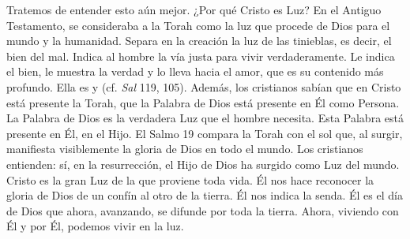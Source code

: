 \begin{body}
Tratemos de entender esto aún mejor. ¿Por qué Cristo es Luz? En el Antiguo Testamento, se consideraba a la Torah como la luz que procede de Dios para el mundo y la humanidad. Separa en la creación la luz de las tinieblas, es decir, el bien del mal. Indica al hombre la vía justa para vivir verdaderamente. Le indica el bien, le muestra la verdad y lo lleva hacia el amor, que es su contenido más profundo. Ella es  y  (cf. \textit{Sal} 119, 105). Además, los cristianos sabían que en Cristo está presente la Torah, que la Palabra de Dios está presente en Él como Persona. La Palabra de Dios es la verdadera Luz que el hombre necesita. Esta Palabra está presente en Él, en el Hijo. El Salmo 19 compara la Torah con el sol que, al surgir, manifiesta visiblemente la gloria de Dios en todo el mundo. Los cristianos entienden: sí, en la resurrección, el Hijo de Dios ha surgido como Luz del mundo. Cristo es la gran Luz de la que proviene toda vida. Él nos hace reconocer la gloria de Dios de un confín al otro de la tierra. Él nos indica la senda. Él es el día de Dios que ahora, avanzando, se difunde por toda la tierra. Ahora, viviendo con Él y por Él, podemos vivir en la luz.


\end{body}

